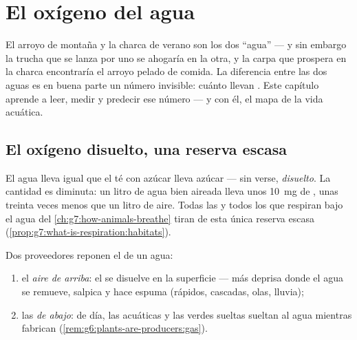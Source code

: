 \chapter{El oxígeno del agua}\label{ch:g7:oxygen-in-the-water}

El arroyo de montaña y la charca de verano son los dos ``agua'' --- y
sin embargo la trucha que se lanza por uno se ahogaría en la otra, y la
carpa que prospera en la charca encontraría el arroyo pelado de
comida. La diferencia entre las dos aguas es en buena parte un número
invisible: cuánto  llevan . Este capítulo aprende a
leer, medir y predecir ese número --- y con él, el mapa de la vida
acuática.

\section{El oxígeno disuelto, una reserva escasa}

\begin{definition}\label{def:g7:oxygen-in-the-water:dissolved}
El agua lleva  igual que el té con azúcar lleva azúcar --- sin
verse, \emph{disuelto}. La cantidad es
diminuta: un litro de agua bien aireada lleva unos \qty{10}{mg} de
, unas treinta veces menos que un litro de aire. Todas las
 y todos los que respiran bajo el agua del
\cref{ch:g7:how-animals-breathe} tiran de esta única reserva escasa
(\cref{prop:g7:what-is-respiration:habitats}).
\end{definition}

\begin{proposition}\label{prop:g7:oxygen-in-the-water:fills}
Dos proveedores reponen el  de un agua:
\begin{enumerate}
  \item el \emph{aire de arriba}: el  se disuelve en la
        superficie --- más deprisa donde el agua se remueve, salpica y
        hace espuma (rápidos, cascadas, olas, lluvia);
  \item las \emph{ de abajo}: de día, las  acuáticas
        y las  verdes sueltas sueltan  al agua mientras
        fabrican (\cref{rem:g6:plants-are-producers:gas}).
\end{enumerate}
\end{proposition}
\admitted

